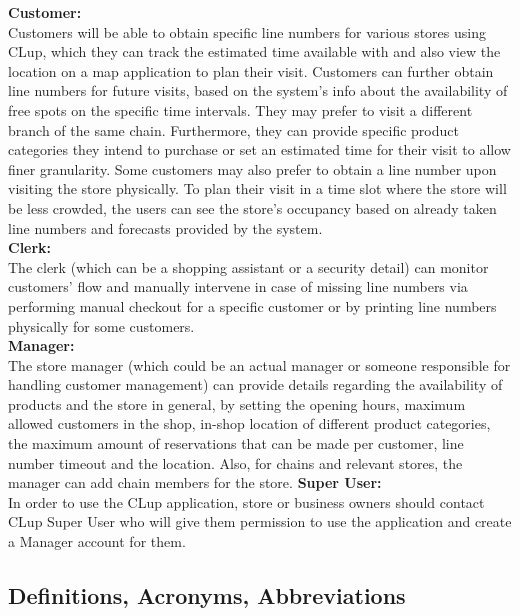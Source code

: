 \textbf{Customer:} \\
Customers will be able to obtain specific line numbers for various stores using CLup, which they can track the estimated time available with and also view the location on a map application to plan their visit.
Customers can further obtain line numbers for future visits, based on the system's info about the availability of free spots on the specific time intervals.
They may prefer to visit a different branch of the same chain.
Furthermore, they can provide specific product categories they intend to purchase or set an estimated time for their visit to allow finer granularity.
Some customers may also prefer to obtain a line number upon visiting the store physically.
To plan their visit in a time slot where the store will be less crowded, the users can see the store's occupancy based on already taken line numbers and forecasts provided by the system.
\\[0.5cm]
\textbf{Clerk:} \\
The clerk (which can be a shopping assistant or a security detail) can monitor customers' flow and manually intervene in case of missing line numbers via performing manual checkout for a specific customer or by printing line numbers physically for some customers.
\\[0.5cm]
\textbf{Manager:} \\
The store manager (which could be an actual manager or someone responsible for handling customer management) can provide details regarding the availability of products and the store in general, by setting the opening hours, maximum allowed customers in the shop, in-shop location of different product categories, the maximum amount of reservations that can be made per customer, line number timeout and the location.
Also, for chains and relevant stores, the manager can add chain members for the store.
\textbf{Super User:} \\
In order to use the CLup application, store or business owners should contact CLup Super User who will give them permission to use the application and create a Manager account for them.


\subsection{Definitions, Acronyms, Abbreviations}
